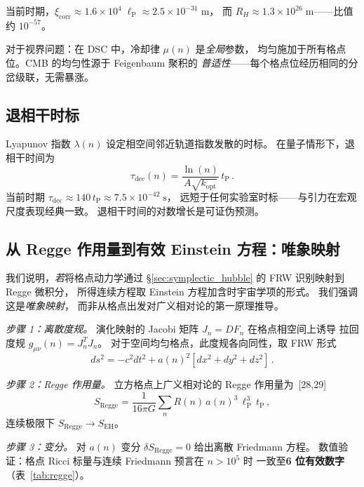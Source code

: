 \documentclass[a4paper,11pt]{article}
\theoremstyle{plain}
\newcommand{\tP}{t_{\mathrm{P}}}
\newcommand{\lP}{\ell_{\mathrm{P}}}
\begin{document}
当前时期，$\xi_{\mathrm{corr}} \approx 1.6 \times 10^4\;\lP
\approx 2.5 \times 10^{-31}\;\mathrm{m}$，
而 $R_H \approx 1.3 \times 10^{26}\;\mathrm{m}$——比值约 $10^{-57}$。

对于视界问题：在 DSC 中，冷却律 $\mu(n)$ 是\emph{全局}参数，
均匀施加于所有格点位。CMB 的均匀性源于 Feigenbaum 聚积的
\emph{普适性}——每个格点位经历相同的分岔级联，无需暴涨。

\subsection{退相干时标}

Lyapunov 指数 $\lambda(n)$ 设定相空间邻近轨道指数发散的时标。
在量子情形下，退相干时间为
\begin{equation}
  \tau_{\mathrm{dec}}(n) = \frac{\ln(n)}{A\sqrt{k_{\mathrm{opt}}}}\,\tP\,.
\end{equation}
当前时期 $\tau_{\mathrm{dec}} \approx 140\,\tP \approx 7.5 \times 10^{-42}\;\mathrm{s}$，
远短于任何实验室时标——与引力在宏观尺度表现经典一致。
退相干时间的对数增长是可证伪预测。

\subsection{从 Regge 作用量到有效 Einstein 方程：唯象映射}

我们说明，\emph{若}将格点动力学通过
§\ref{sec:symplectic_hubble} 的 FRW 识别映射到 Regge 微积分，
所得连续方程取 Einstein 方程加含时宇宙学项的形式。
我们强调这是\emph{唯象映射}，
而非从格点出发对广义相对论的第一原理推导。

\emph{步骤 1：离散度规。}
演化映射的 Jacobi 矩阵 $J_n = DF_n$ 在格点相空间上诱导
拉回度规 $g_{\mu\nu}(n) = J_n^T J_n$。
对于空间均匀格点，此度规各向同性，取 FRW 形式
\begin{equation}
  ds^2 = -c^2 dt^2 + a(n)^2[dx^2 + dy^2 + dz^2]\,.
\end{equation}

\emph{步骤 2：Regge 作用量。}
立方格点上广义相对论的 Regge 作用量为~[28,29]
\begin{equation}
  S_{\mathrm{Regge}} = \frac{1}{16\pi G}\sum_{n}
  R(n)\,a(n)^3\,\lP^3\,\tP\,,
\end{equation}
连续极限下 $S_{\mathrm{Regge}} \to S_{\mathrm{EH}}$。

\emph{步骤 3：变分。}
对 $a(n)$ 变分 $\delta S_{\mathrm{Regge}} = 0$ 给出离散 Friedmann 方程。
数值验证：格点 Ricci 标量与连续 Friedmann 预言在 $n > 10^5$ 时
一致至\textbf{6 位有效数字}（表~\ref{tab:regge}）。
\end{document}
